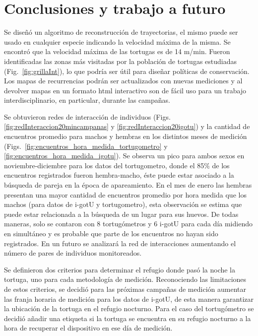 \chapter{Conclusiones y trabajo a futuro}
 
Se diseñó un algoritmo de reconstrucción de trayectorias, el mismo puede ser usado en cualquier especie indicando la velocidad máxima de la misma. Se encontró que la velocidad máxima de las tortugas es de 14 m/min. Fueron identificadas las zonas más visitadas por la población de tortugas estudiadas (Fig.~\ref{fig:grillaInt}), lo que podría ser útil para diseñar políticas de conservación. Los mapas de recurrencias podrán ser actualizados con nuevas mediciones y al devolver mapas en un formato html interactivo son de fácil uso para un trabajo interdisciplinario, en particular, durante las campañas.
 
Se obtuvieron redes  de interacción de individuos (Figs. \ref{fig:redInteraccion20mincampanas} y \ref{fig:redInteraccion20igotu}) y la cantidad de encuentros promedio para machos y hembras en los distintos meses de medición (Figs.~\ref{fig:encuentros_hora_medida_tortugometro} y \ref{fig:encuentros_hora_medida_igotu}). Se observa un pico para ambos sexos en noviembre-diciembre para los datos del tortugometro, donde el 85\% de los encuentros registrados fueron hembra-macho, éste puede estar asociado a la búsqueda de pareja en la época de apareamiento. En el mes de enero las hembras presentan una mayor cantidad de encuentros promedio por hora medida que los machos (para datos de i-gotU y tortugometro), esta observación se estima que puede estar relacionada a la búsqueda de un lugar para sus huevos. De todas maneras, solo se contaron con 8 tortugómetros y 6 i-gotU  para cada día midiendo en simultáneo y es probable que parte de los encuentros no hayan sido registrados. En un futuro se analizará la red de interacciones aumentando el número de pares de individuos monitoreados.
 
 
Se definieron dos criterios para determinar el refugio donde pasó la noche la tortuga, uno para cada metodología de medición. Reconociendo las limitaciones de estos criterios, se decidió para las próximas campañas de medición aumentar las franja horaria de medición para los datos de i-gotU, de esta manera garantizar la ubicación de la tortuga en el refugio nocturno. Para el caso del tortugómetro se decidió añadir una etiqueta si la tortuga se encuentra en su refugio nocturno a la hora de recuperar el dispositivo en ese día de medición.
 
